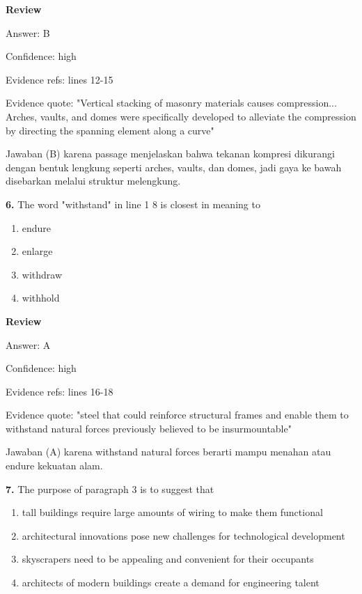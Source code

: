 \documentclass[12pt]{article}
\begin{document}
\par
\begingroup
\setlength{\parskip}{0pt}
\setlength{\parindent}{0pt}
\textbf{Review}\par
Answer: B\par
Confidence: high\par
Evidence refs: lines 12-15\par
Evidence quote: "Vertical stacking of masonry materials causes compression... Arches, vaults, and domes were specifically developed to alleviate the compression by directing the spanning element along a curve"\par
Jawaban (B) karena passage menjelaskan bahwa tekanan kompresi dikurangi dengan bentuk lengkung seperti arches, vaults, dan domes, jadi gaya ke bawah disebarkan melalui struktur melengkung.\par
\endgroup
\par
\vspace{0.25\baselineskip}
\noindent\textbf{6.} The word "withstand" in line 1 8 is closest in meaning to
\begin{enumerate}[label=(\Alph*),leftmargin=*,itemsep=0.2em]
\item endure
\item enlarge
\item withdraw
\item withhold
\end{enumerate}
\par
\begingroup
\setlength{\parskip}{0pt}
\setlength{\parindent}{0pt}
\textbf{Review}\par
Answer: A\par
Confidence: high\par
Evidence refs: lines 16-18\par
Evidence quote: "steel that could reinforce structural frames and enable them to withstand natural forces previously believed to be insurmountable"\par
Jawaban (A) karena withstand natural forces berarti mampu menahan atau endure kekuatan alam.\par
\endgroup
\par
\vspace{0.25\baselineskip}
\noindent\textbf{7.} The purpose of paragraph 3 is to suggest that
\begin{enumerate}[label=(\Alph*),leftmargin=*,itemsep=0.2em]
\item tall buildings require large amounts of wiring to make them functional
\item architectural innovations pose new challenges for technological development
\item skyscrapers need to be appealing and convenient for their occupants
\item architects of modern buildings create a demand for engineering talent
\end{enumerate}
\end{document}
